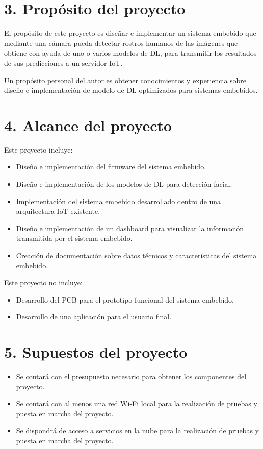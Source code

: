 \documentclass[
11pt, %
]{plan}
\begin{document}
\section{3. Propósito del proyecto}
\label{sec:proposito}

El propósito de este proyecto es diseñar e implementar un sistema embebido que mediante una cámara pueda detectar rostros humanos de las imágenes que obtiene con ayuda de uno o varios modelos de DL, para transmitir los resultados de sus predicciones a un servidor IoT.

Un propósito personal del autor es obtener conocimientos y experiencia sobre diseño e implementación de modelo de DL optimizados para sistemas embebidos.

\section{4. Alcance del proyecto}
\label{sec:alcance}

Este proyecto incluye:
\begin{itemize}
	\item Diseño e implementación del firmware del sistema embebido.
	\item Diseño e implementación de los modelos de DL para detección facial.
	\item Implementación del sistema embebido desarrollado dentro de una arquitectura IoT existente.
	\item Diseño e implementación de un dashboard para visualizar la información transmitida por el sistema embebido.
	\item Creación de documentación sobre datos técnicos y características del sistema embebido.
\end{itemize}

Este proyecto no incluye:
\begin{itemize}
	\item Desarrollo del PCB para el prototipo funcional del sistema embebido.
	\item Desarrollo de una aplicación para el usuario final.
\end{itemize}

\section{5. Supuestos del proyecto}
\label{sec:supuestos}

\begin{itemize}
	\item Se contará con el presupuesto necesario para obtener los componentes del proyecto.
	\item Se contará con al menos una red Wi-Fi local para la realización de pruebas y puesta en marcha del proyecto.
	\item Se dispondrá de acceso a servicios en la nube para la realización de pruebas y puesta en marcha del proyecto.
\end{itemize}
\end{document}
